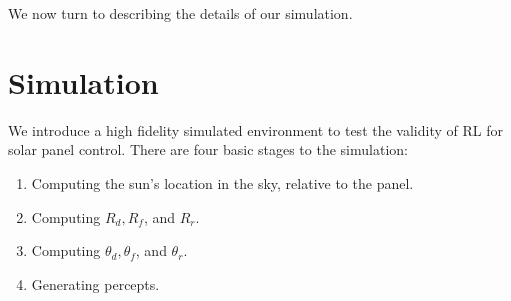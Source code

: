 \documentclass{article}
\newcommand{\mc}{\mathcal}
\DeclareMathOperator*{\argmax}{arg\,max}
\begin{document}
{%

We now turn to describing the details of our simulation.

\section{Simulation}
\label{sec:simulation}

We introduce a high fidelity simulated environment to test the validity of RL for solar panel control. There are four basic stages to the simulation:
\begin{enumerate}
\item Computing the sun's location in the sky, relative to the panel.
\item Computing $R_d, R_f$, and $R_r$.
\item Computing $\theta_d, \theta_f$, and $\theta_r$.
\item Generating percepts.
\end{enumerate}

}
\end{document}
